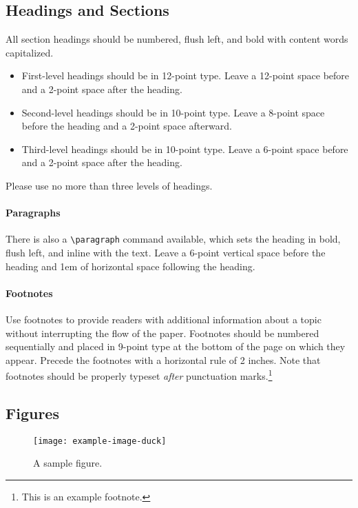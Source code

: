 \documentclass{article}
\begin{document}
\subsection{Headings and Sections}

All section headings should be numbered, flush left, and bold with content words capitalized.
\begin{itemize}
	\item First-level headings should be in 12-point type. Leave a 12-point space before and a 2-point space after the heading.
	\item Second-level headings should be in 10-point type. Leave a 8-point space before the heading and a 2-point space afterward.
	\item Third-level headings should be in 10-point type. Leave a 6-point space before and a 2-point space after the heading.
\end{itemize}
Please use no more than three levels of headings.

\paragraph{Paragraphs}
There is also a \verb+\paragraph+ command available, which sets the heading in bold, flush left, and inline with the text.
Leave a 6-point vertical space before the heading and 1em of horizontal space following the heading.

\paragraph{Footnotes}
Use footnotes to provide readers with additional information about a topic without interrupting the flow of the paper.
Footnotes should be numbered sequentially and placed in 9-point type at the bottom of the page on which they appear.
Precede the footnotes with a horizontal rule of 2 inches.
Note that footnotes should be properly typeset \emph{after} punctuation marks.\footnote{This is an example footnote.}

\subsection{Figures}

\begin{figure}
	\centering
	\texttt{[image: example-image-duck]}
	\caption{A sample figure.}
	\label{fig:sample}
\end{figure}
\end{document}
